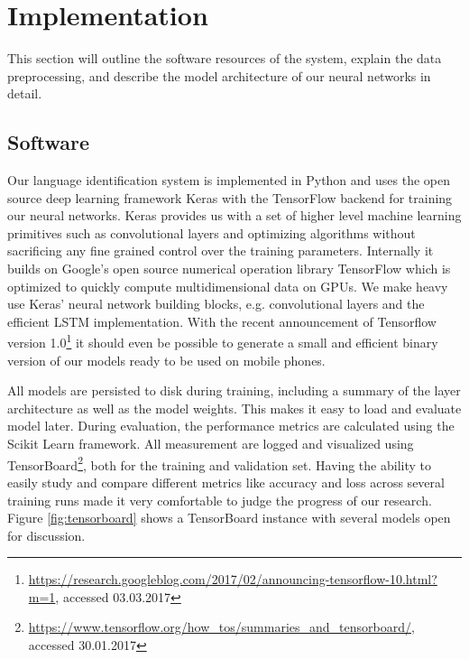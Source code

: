 \section{Implementation}
This section will outline the software resources of the system, explain the data preprocessing, and describe the model architecture of our neural networks in detail.

\subsection{Software}
\label{sec:software}

	Our language identification system is implemented in Python and uses the open source deep learning framework Keras\cite{chollet2015keras} with the TensorFlow\cite{abadi2016tensorflow} backend for training our neural networks. Keras provides us with a set of higher level machine learning primitives such as convolutional layers and optimizing algorithms without sacrificing any fine grained control over the training parameters. Internally it builds on Google's open source numerical operation library TensorFlow which is optimized to quickly compute multidimensional data on GPUs. We make heavy use Keras' neural network building blocks, e.g. convolutional layers and the efficient LSTM implementation. With the recent announcement of Tensorflow version 1.0\footnote{\url{https://research.googleblog.com/2017/02/announcing-tensorflow-10.html?m=1}, accessed 03.03.2017} it should even be possible to generate a small and efficient binary version of our models ready to be used on mobile phones.
	
	All models are persisted to disk during training, including a summary of the layer architecture as well as the model weights. This makes it easy to load and evaluate model later. During evaluation, the performance metrics are calculated using the Scikit Learn\cite{scikit-learn} framework. All measurement are logged and visualized using TensorBoard\footnote{\url{https://www.tensorflow.org/how_tos/summaries_and_tensorboard/}, accessed 30.01.2017}, both for the training and validation set. Having the ability to easily study and compare different metrics like accuracy and loss across several training runs made it very comfortable to judge the progress of our research. Figure \ref{fig:tensorboard} shows a TensorBoard instance with several models open for discussion. 

